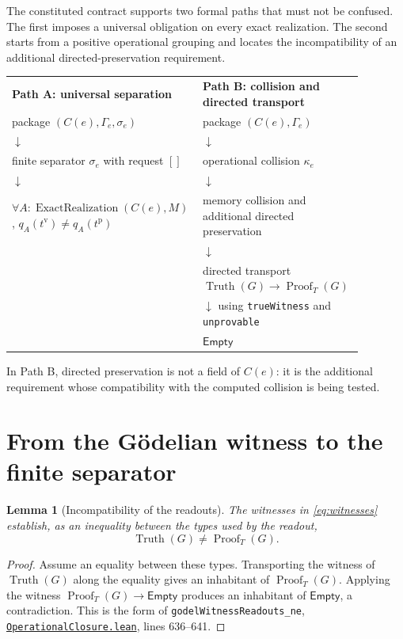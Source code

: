 \documentclass[11pt,a4paper]{article}
\newcommand{\Truth}{\operatorname{Truth}}
\newcommand{\Proof}{\operatorname{Proof}}
\newcommand{\ExactRealization}{\operatorname{ExactRealization}}
\newcommand{\Empty}{\mathsf{Empty}}
\newcommand{\code}[1]{\nolinkurl{#1}}
\newcommand{\SourceAt}[3]{\href{https://github.com/JohnDoe-collab-stack/relational-perimeter/blob/1e5aeda745559d62a3819bb3213da7fce3c31ad1/#1\#L#2}{\nolinkurl{#3}}}
\newtheorem{lemma}[theorem]{Lemma}
\theoremstyle{remark}
\begin{document}
The constituted contract supports two formal paths that must not be
confused. The first imposes a universal obligation on every exact
realization. The second starts from a positive operational grouping and
locates the incompatibility of an additional directed-preservation
requirement.

\begin{center}
\renewcommand{\arraystretch}{1.25}
\begin{tabular}{>{\centering\arraybackslash}p{0.44\linewidth}
                >{\centering\arraybackslash}p{0.44\linewidth}}
\textbf{Path A: universal separation}
& \textbf{Path B: collision and directed transport} \\
package $(C(e),\Gamma_e,\sigma_e)$ & package $(C(e),\Gamma_e)$ \\
$\downarrow$ & $\downarrow$ \\
finite separator $\sigma_e$ with request $[]$ & operational collision $\kappa_e$ \\
$\downarrow$ & $\downarrow$ \\
$\forall A:\ExactRealization(C(e),M)$,
$q_A(t^{\mathrm v})\neq q_A(t^{\mathrm p})$
& memory collision and additional directed preservation \\
& $\downarrow$ \\
& directed transport $\Truth(G)\to\Proof_T(G)$ \\
& $\downarrow$ using \code{trueWitness} and \code{unprovable} \\
& $\Empty$
\end{tabular}
\end{center}

In Path B, directed preservation is not a field of $C(e)$: it is the
additional requirement whose compatibility with the computed collision is
being tested.

\section{From the Gödelian witness to the finite separator}
\label{sec:separator}

\begin{lemma}[Incompatibility of the readouts]\label{lem:readout}
The witnesses in \eqref{eq:witnesses} establish, as an inequality between
the types used by the readout,
\[
\Truth(G)\neq\Proof_T(G).
\]
\end{lemma}
\begin{proof}
Assume an equality between these types. Transporting the witness of
$\Truth(G)$ along the equality gives an inhabitant of $\Proof_T(G)$.
Applying the witness $\Proof_T(G)\to\Empty$ produces an inhabitant of
$\Empty$, a contradiction. This is the form of
\code{godelWitnessReadouts\_ne},
\SourceAt{RelationalPerimeter/Constitution/Godel/OperationalClosure.lean}{636-L641}{OperationalClosure.lean},
lines 636--641.
\end{proof}
\end{document}

